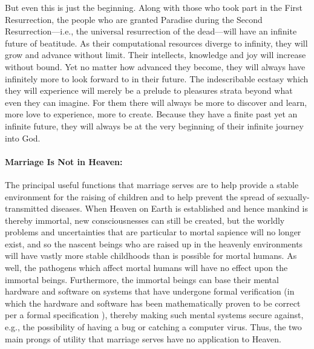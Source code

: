 \documentclass[letterpaper,12pt]{article}
\begin{document}
But even this is just the beginning. Along with those who took part in the First Resurrection, the people who are granted Paradise during the Second Resurrection---i.e., the universal resurrection of the dead---will have an infinite future of beatitude. As their computational resources diverge to infinity, they will grow and advance without limit. Their intellects, knowledge and joy will increase without bound. Yet no matter how advanced they become, they will always have infinitely more to look forward to in their future. The indescribable ecstasy which they will experience will merely be a prelude to pleasures strata beyond what even they can imagine. For them there will always be more to discover and learn, more love to experience, more to create. Because they have a finite past yet an infinite future, they will always be at the very beginning of their infinite journey into God.

\paragraph{Marriage Is Not in Heaven:}
\label{parag:MarriageIsNotInHeaven}

The principal useful functions that marriage serves are to help provide a stable environment for the raising of children and to help prevent the spread of sexually-transmitted diseases. When Heaven on Earth is established and hence mankind is thereby immortal, new consciousnesses can still be created, but the worldly problems and uncertainties that are particular to mortal sapience will no longer exist, and so the nascent beings who are raised up in the heavenly environments will have vastly more stable childhoods than is possible for mortal humans. As well, the pathogens which affect mortal humans will have no effect upon the immortal beings. Furthermore, the immortal beings can base their mental hardware and software on systems that have undergone formal verification (in which the hardware and software has been mathematically proven to be correct per a formal specification \cite{KleinEtAl2009-10,KleinEtAl2010-6}), thereby making such mental systems secure against, e.g., the possibility of having a bug or catching a computer virus. Thus, the two main prongs of utility that marriage serves have no application to Heaven.
\end{document}
